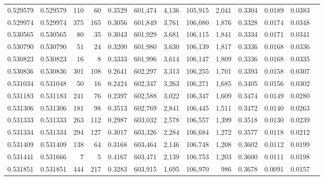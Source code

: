 \begin{tabular}{rrrrrrrrrrrrr}
0.529579 & 0.529579 &   110 &    60 &                                     0.3529 & 601,474 &   4,136 & 105,915 &   2,041 & 0.3304 & 0.0189 & 0.0383 \\
0.529974 & 0.529974 &   375 &   165 &                                     0.3056 & 601,849 &   3,761 & 106,080 &   1,876 & 0.3328 & 0.0174 & 0.0348 \\
0.530565 & 0.530565 &    80 &    35 &                                     0.3043 & 601,929 &   3,681 & 106,115 &   1,841 & 0.3334 & 0.0171 & 0.0341 \\
0.530790 & 0.530790 &    51 &    24 &                                     0.3200 & 601,980 &   3,630 & 106,139 &   1,817 & 0.3336 & 0.0168 & 0.0336 \\
0.530823 & 0.530823 &    16 &     8 &                                     0.3333 & 601,996 &   3,614 & 106,147 &   1,809 & 0.3336 & 0.0168 & 0.0335 \\
0.530836 & 0.530836 &   301 &   108 &                                     0.2641 & 602,297 &   3,313 & 106,255 &   1,701 & 0.3393 & 0.0158 & 0.0307 \\
0.531034 & 0.531048 &    50 &    16 &                                     0.2424 & 602,347 &   3,263 & 106,271 &   1,685 & 0.3405 & 0.0156 & 0.0302 \\
0.531183 & 0.531183 &   241 &    76 &                                     0.2397 & 602,588 &   3,022 & 106,347 &   1,609 & 0.3474 & 0.0149 & 0.0280 \\
0.531306 & 0.531306 &   181 &    98 &                                     0.3513 & 602,769 &   2,841 & 106,445 &   1,511 & 0.3472 & 0.0140 & 0.0263 \\
0.531333 & 0.531333 &   263 &   112 &                                     0.2987 & 603,032 &   2,578 & 106,557 &   1,399 & 0.3518 & 0.0130 & 0.0239 \\
0.531334 & 0.531334 &   294 &   127 &                                     0.3017 & 603,326 &   2,284 & 106,684 &   1,272 & 0.3577 & 0.0118 & 0.0212 \\
0.531409 & 0.531409 &   138 &    64 &                                     0.3168 & 603,464 &   2,146 & 106,748 &   1,208 & 0.3602 & 0.0112 & 0.0199 \\
0.531441 & 0.531666 &     7 &     5 &                                     0.4167 & 603,471 &   2,139 & 106,753 &   1,203 & 0.3600 & 0.0111 & 0.0198 \\
0.531851 & 0.531851 &   444 &   217 &                                     0.3283 & 603,915 &   1,695 & 106,970 &     986 & 0.3678 & 0.0091 & 0.0157 \\

\end{tabular}
